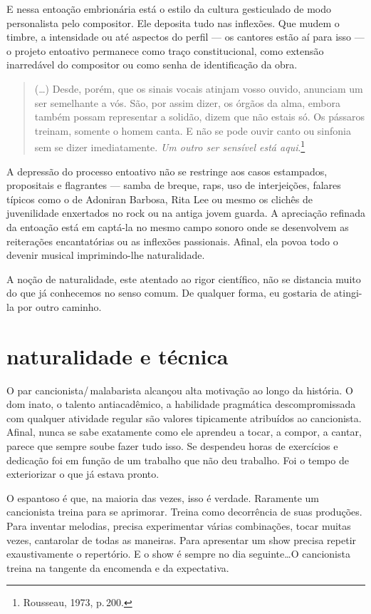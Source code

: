 E nessa entoação embrionária está o estilo da cultura gesticulado de
modo personalista pelo compositor. Ele deposita tudo nas inflexões. Que
mudem o timbre, a intensidade ou até aspectos do perfil --- os cantores
estão aí para isso --- o projeto entoativo permanece como traço
constitucional, como extensão inarredável do compositor ou como senha de
identificação da obra.

\begin{quote}
(\ldots) Desde, porém, que os sinais vocais atinjam vosso ouvido, anunciam
um ser semelhante a vós. São, por assim dizer, os órgãos da alma, embora
também possam representar a solidão, dizem que não estais só. Os
pássaros treinam, somente o homem canta. E não se pode ouvir canto ou
sinfonia sem se dizer imediatamente. \textit{Um outro ser sensível está aqui}.\footnote{Rousseau, 1973, p.\,200.}
\end{quote}

A depressão do processo entoativo não se restringe aos casos estampados,
propositais e flagrantes --- samba de breque, raps, uso de interjeições,
falares típicos como o de Adoniran Barbosa, Rita Lee ou mesmo os clichês
de juvenilidade enxertados no rock ou na antiga jovem guarda. A
apreciação refinada da entoação está em captá-la no mesmo campo sonoro
onde se desenvolvem as reiterações encantatórias ou as inflexões
passionais. Afinal, ela povoa todo o devenir musical imprimindo-lhe
naturalidade.

A noção de naturalidade, este atentado ao rigor científico, não se
distancia muito do que já conhecemos no senso comum. De qualquer forma,
eu gostaria de atingi-la por outro caminho.

\section{naturalidade e técnica}

O par cancionista/\,malabarista alcançou alta motivação ao longo da
história. O dom inato, o talento antiacadêmico, a habilidade pragmática
descompromissada com qualquer atividade regular são valores tipicamente
atribuídos ao cancionista. Afinal, nunca se sabe exatamente como ele
aprendeu a tocar, a compor, a cantar, parece que sempre soube fazer tudo
isso. Se despendeu horas de exercícios e dedicação foi em função de um
trabalho que não deu trabalho. Foi o tempo de exteriorizar o que já
estava pronto.

O espantoso é que, na maioria das vezes, isso é verdade. Raramente um
cancionista treina para se aprimorar. Treina como decorrência de suas
produções. Para inventar melodias, precisa experimentar várias
combinações, tocar muitas vezes, cantarolar de todas as maneiras. Para
apresentar um show precisa repetir exaustivamente o repertório. E o show
é sempre no dia seguinte\ldots O cancionista treina na tangente da
encomenda e da expectativa.

